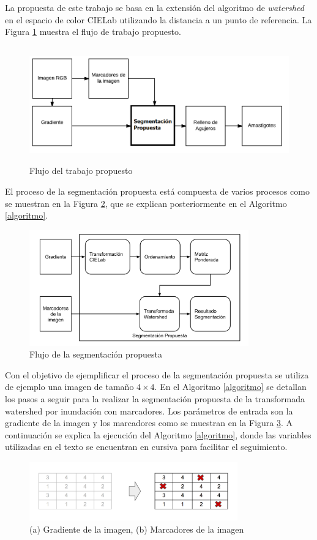 La propuesta de este trabajo se basa en la extensión del algoritmo de \textit{watershed} en el espacio de color CIELab utilizando la distancia a un punto de referencia. La Figura \ref{img:flujo} muestra el flujo de trabajo propuesto. 
\begin{figure}[h!]
\centering
\includegraphics[height=50mm]{./figuras/flujo.png}
\caption{Flujo del trabajo propuesto}
\label{img:flujo}
\end{figure}
El proceso de la segmentación propuesta está compuesta de varios procesos como se muestran en la Figura \ref{img:segpropuesta}, que se explican posteriormente en el Algoritmo \ref{algoritmo}. 
\begin{figure}[h!]
\centering
\includegraphics[height=50mm]{./figuras/segmentacion_propuesta.png}
\caption{Flujo de la segmentación propuesta}
\label{img:segpropuesta}
\end{figure}
Con el objetivo de ejemplificar el proceso de la segmentación propuesta se utiliza de ejemplo una imagen de tamaño $4 \times 4$. En el Algoritmo \ref{algoritmo} se detallan los pasos a seguir para la realizar la segmentación propuesta de la transformada watershed por inundación con marcadores. Los parámetros de entrada son la gradiente de la imagen y los marcadores como se muestran en la Figura \ref{img:vector-imagen}. A continuación se explica la ejecución del Algoritmo \ref{algoritmo}, donde las variables utilizadas en el texto se encuentran en cursiva para facilitar el seguimiento. 
\begin{figure}[h!]
\centering
\includegraphics[width=90mm]{./inundacion/inicial.png}
\caption{(a) Gradiente de la imagen, (b) Marcadores de la imagen}
\label{img:vector-imagen}
\end{figure}

